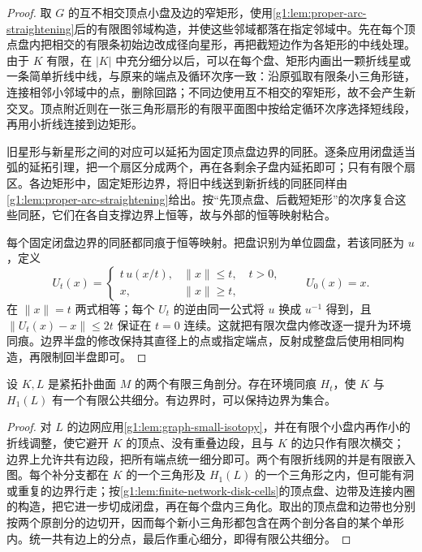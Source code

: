 \begin{proof}
	取 \(G\) 的互不相交顶点小盘及边的窄矩形，使用\cref{g1:lem:proper-arc-straightening}后的有限图邻域构造，并使这些邻域都落在指定邻域中。先在每个顶点盘内把相交的有限条初始边改成径向星形，再把截短边作为各矩形的中线处理。由于 \(K\) 有限，在 \(|K|\) 中充分细分以后，可以在每个盘、矩形内画出一颗折线星或一条简单折线中线，与原来的端点及循环次序一致：沿原弧取有限条小三角形链，连接相邻小邻域中的点，删除回路；不同边使用互不相交的窄矩形，故不会产生新交叉。顶点附近则在一张三角形扇形的有限平面图中按给定循环次序选择短线段，再用小折线连接到边矩形。

	旧星形与新星形之间的对应可以延拓为固定顶点盘边界的同胚。逐条应用闭盘适当弧的延拓引理，把一个扇区分成两个，再在各剩余子盘内延拓即可；只有有限个扇区。各边矩形中，固定矩形边界，将旧中线送到新折线的同胚同样由\cref{g1:lem:proper-arc-straightening}给出。按“先顶点盘、后截短矩形”的次序复合这些同胚，它们在各自支撑边界上恒等，故与外部的恒等映射粘合。

	每个固定闭盘边界的同胚都同痕于恒等映射。把盘识别为单位圆盘，若该同胚为 \(u\)，定义
	\[
		U_t(x)=
		\begin{cases}
			t\,u(x/t),&\|x\|\le t,\quad t>0,\\
			x,&\|x\|\ge t,
		\end{cases}
		\qquad U_0(x)=x.
	\]
	在 \(\|x\|=t\) 两式相等；每个 \(U_t\) 的逆由同一公式将 \(u\) 换成 \(u^{-1}\) 得到，且 \(\|U_t(x)-x\|\le2t\) 保证在 \(t=0\) 连续。这就把有限次盘内修改逐一提升为环境同痕。边界半盘的修改保持其直径上的点或指定端点，反射成整盘后使用相同构造，再限制回半盘即可。
\end{proof}

\begin{theorem}\label{g1:thm:common-subdivision-isotopy}
	设 \(K,L\) 是紧拓扑曲面 \(M\) 的两个有限三角剖分。存在环境同痕 \(H_t\)，使 \(K\) 与 \(H_1(L)\) 有一个有限公共细分。有边界时，可以保持边界为集合。
\end{theorem}

\begin{proof}
	对 \(L\) 的边网应用\cref{g1:lem:graph-small-isotopy}，并在有限个小盘内再作小的折线调整，使它避开 \(K\) 的顶点、没有重叠边段，且与 \(K\) 的边只作有限次横交；边界上允许共有边段，把所有端点统一细分即可。两个有限折线网的并是有限嵌入图。每个补分支都在 \(K\) 的一个三角形及 \(H_1(L)\) 的一个三角形之内，但可能有洞或重复的边界行走；按\cref{g1:lem:finite-network-disk-cells}的顶点盘、边带及连接内圈的构造，把它进一步切成闭盘，再在每个盘内三角化。取出的顶点盘和边带也分别按两个原剖分的边切开，因而每个新小三角形都包含在两个剖分各自的某个单形内。统一共有边上的分点，最后作重心细分，即得有限公共细分。
\end{proof}

